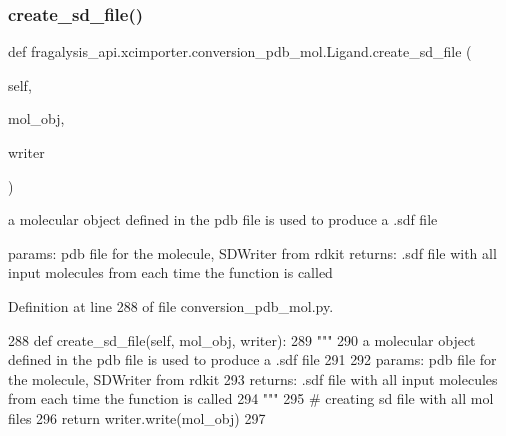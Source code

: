 \subsubsection{\texorpdfstring{create\+\_\+sd\+\_\+file()}{create\_sd\_file()}}
{\footnotesize\ttfamily def fragalysis\+\_\+api.\+xcimporter.\+conversion\+\_\+pdb\+\_\+mol.\+Ligand.\+create\+\_\+sd\+\_\+file (\begin{DoxyParamCaption}\item[{}]{self,  }\item[{}]{mol\+\_\+obj,  }\item[{}]{writer }\end{DoxyParamCaption})}

\begin{DoxyVerb}a molecular object defined in the pdb file is used to produce a .sdf file

params: pdb file for the molecule, SDWriter from rdkit
returns: .sdf file with all input molecules from each time the function is called
\end{DoxyVerb}
 

Definition at line 288 of file conversion\+\_\+pdb\+\_\+mol.\+py.


\begin{DoxyCode}
288     \textcolor{keyword}{def }create\_sd\_file(self, mol\_obj, writer):
289         \textcolor{stringliteral}{"""}
290 \textcolor{stringliteral}{        a molecular object defined in the pdb file is used to produce a .sdf file}
291 \textcolor{stringliteral}{}
292 \textcolor{stringliteral}{        params: pdb file for the molecule, SDWriter from rdkit}
293 \textcolor{stringliteral}{        returns: .sdf file with all input molecules from each time the function is called}
294 \textcolor{stringliteral}{        """}
295         \textcolor{comment}{# creating sd file with all mol files}
296         \textcolor{keywordflow}{return} writer.write(mol\_obj)
297 
\end{DoxyCode}
\mbox{\label{classfragalysis__api_1_1xcimporter_1_1conversion__pdb__mol_1_1_ligand_aa9601289368daa83655aa849041e7b63}} 
